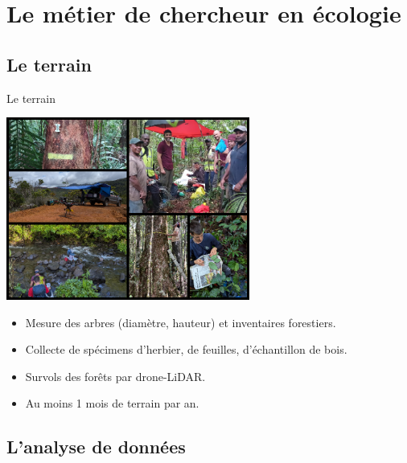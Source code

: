 \documentclass[10pt,table,dvipsnames,compress]{beamer}
\begin{document}
\section{Le métier de chercheur en écologie}
\label{sec:org4ca88d1}

\subsection{Le terrain}
\label{sec:org08cf7f9}

\begin{frame}[label={sec:org58aed0d}]{Le terrain}
\begin{center}
\includegraphics[width=0.6\textwidth]{figs/terrain-collage.png}
\end{center}

\begin{itemize}
\item Mesure des arbres (diamètre, hauteur) et inventaires forestiers.
\item Collecte de spécimens d'herbier, de feuilles, d'échantillon de bois.
\item Survols des forêts par drone-LiDAR.
\item Au moins 1 mois de terrain par an.
\end{itemize}
\end{frame}
\subsection{L'analyse de données}
\label{sec:org0d4efcf}
\end{document}
